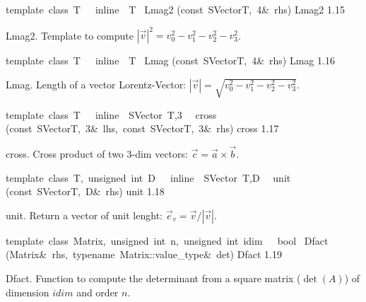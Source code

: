 \documentclass{article}
\begin{document}
\begin{cxxentry}
\begin{cxxfunction}
\begin{cxxdoc}
\end{cxxdoc}
\end{cxxfunction}
\begin{cxxfunction}
{template\ \<class\ T\>\ \ \ inline\ \ T\ }
        {Lmag2}
        {(const\ SVector\<T,\ 4\>\&\ rhs)}
        {Lmag2}
        {1.15}
\begin{cxxdoc}
Lmag2.
Template to compute $|\vec{v}|^2 = v_0^2 - v_1^2 - v_2^2 -v_3^2$.


\end{cxxdoc}
\end{cxxfunction}
\begin{cxxfunction}
{template\ \<class\ T\>\ \ \ inline\ \ T\ }
        {Lmag}
        {(const\ SVector\<T,\ 4\>\&\ rhs)}
        {Lmag}
        {1.16}
\begin{cxxdoc}
Lmag.
Length of a vector Lorentz-Vector: $|\vec{v}| = \sqrt{v_0^2 -
v_1^2 - v_2^2 -v_3^2}$.


\end{cxxdoc}
\end{cxxfunction}
\begin{cxxfunction}
{template\ \<class\ T\>\ \ \ inline\ \ SVector\ \<T,3\>\ \ }
        {cross}
        {(const\ SVector\<T,\ 3\>\&\ lhs,\ const\ SVector\<T,\ 3\>\&\ rhs)}
        {cross}
        {1.17}
\begin{cxxdoc}
cross.
Cross product of two 3-dim vectors: $\vec{c} = \vec{a}\times\vec{b}$.


\end{cxxdoc}
\end{cxxfunction}
\begin{cxxfunction}
{template\ \<class\ T,\ unsigned\ int\ D\>\ \ \ inline\ \ SVector\ \<T,D\>\ \ }
        {unit}
        {(const\ SVector\<T,\ D\>\&\ rhs)}
        {unit}
        {1.18}
\begin{cxxdoc}
unit.
Return a vector of unit lenght: $\vec{e}_v = \vec{v}/|\vec{v}|$.


\end{cxxdoc}
\end{cxxfunction}
\begin{cxxfunction}
{template\ \<class\ Matrix,\ unsigned\ int\ n,\ unsigned\ int\ idim\>\ \ \ bool\ }
        {Dfact}
        {(Matrix\&\ rhs,\ typename\ Matrix::value\_type\&\ det)}
        {Dfact}
        {1.19}
\begin{cxxdoc}
Dfact.
Function to compute the determinant from a square matrix ($\det(A)$) of
dimension $idim$ and order $n$.



\end{cxxdoc}
\end{cxxfunction}
\end{cxxentry}
\end{document}
